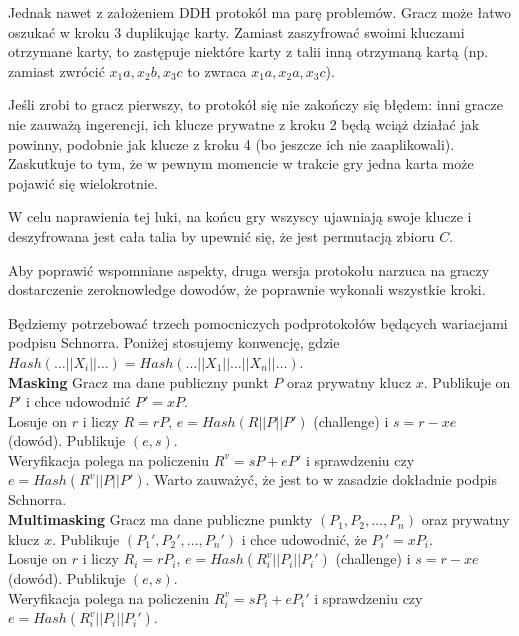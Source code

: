 \documentclass{article}
\begin{document}
Jednak nawet z założeniem DDH protokół ma parę problemów. Gracz może łatwo oszukać w kroku 3 duplikując karty. Zamiast zaszyfrować swoimi kluczami otrzymane karty, to zastępuje niektóre karty z talii inną otrzymaną kartą (np. zamiast zwrócić $x_1a,x_2b,x_3c$ to zwraca $x_1a,x_2a,x_3c$).

Jeśli zrobi to gracz pierwszy, to protokół się nie zakończy się błędem: inni gracze nie zauważą ingerencji, ich klucze prywatne z kroku 2 będą wciąż działać jak powinny, podobnie jak klucze z kroku 4 (bo jeszcze ich nie zaaplikowali). Zaskutkuje to tym, że w pewnym momencie w trakcie gry jedna karta może pojawić się wielokrotnie.

W celu naprawienia tej luki, na końcu gry wszyscy ujawniają swoje klucze i deszyfrowana jest cała talia by upewnić się, że jest permutacją zbioru $C$.

Aby poprawić wspomniane aspekty, druga wersja protokołu narzuca na graczy dostarczenie zero\-knowledge dowodów, że poprawnie wykonali wszystkie kroki.

Będziemy potrzebować trzech pomocniczych podprotokołów będących wariacjami podpisu Schnorra. Poniżej stosujemy konwencję, gdzie $Hash(\ldots || X_i || \ldots) = Hash(\ldots || X_1 || \ldots || X_n || \ldots)$.
\\

\noindent \textbf{Masking} Gracz ma dane publiczny punkt $P$ oraz prywatny klucz $x$. Publikuje on $P'$ i chce udowodnić $P' = xP$.
\\

\noindent Losuje on $r$ i liczy $R = rP$, $e = Hash(R || P || P')$ (challenge) i $s = r - xe$ (dowód). Publikuje $(e,s)$. 
\\

\noindent Weryfikacja polega na policzeniu $R^v = sP + eP'$ i sprawdzeniu czy $e = Hash(R^v || P || P')$. Warto zauważyć, że jest to w zasadzie dokładnie podpis Schnorra.
\\

\noindent \textbf{Multimasking}
Gracz ma dane publiczne punkty $(P_1,P_2,\ldots,P_n)$ oraz prywatny klucz $x$. Publikuje $(P_1',P_2',\ldots,P_n')$ i chce udowodnić, że $P_i'=xP_i$.
\\

\noindent Losuje on $r$ i liczy $R_i = rP_i$, $e = Hash(R_i^v || P_i || P_i')$ (challenge) i $s = r - xe$ (dowód). Publikuje $(e,s)$.
\\

\noindent Weryfikacja polega na policzeniu $R_i^v = sP_i + eP_i'$ i sprawdzeniu czy $e = Hash(R_i^v || P_i || P_i')$.
\\
\end{document}
